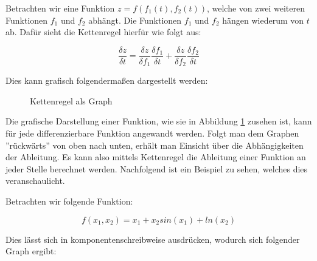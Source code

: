 Betrachten wir eine Funktion $z = f(f_1(t),f_2(t))$, welche von zwei weiteren Funktionen $f_1$ und $f_2$ abhängt. Die Funktionen $f_1$ und $f_2$ hängen wiederum von $t$ ab. Dafür sieht die Kettenregel hierfür wie folgt aus:

\begin{equation}\label{eq:Kettenregel}
\frac{\delta z}{\delta t} = \frac{\delta z}{\delta f_1}\frac{\delta f_1}{\delta t} + \frac{\delta z}{\delta f_2}\frac{\delta f_2}{\delta t} 
\end{equation}

Dies kann grafisch folgendermaßen dargestellt werden:

\begin{figure}[H]
 \centering
{}
\caption{Kettenregel als Graph \label{fig:KettenregelGraph}}
\end{figure}

Die grafische Darstellung einer Funktion, wie sie in Abbildung \ref{fig:KettenregelGraph} zusehen ist, kann für jede differenzierbare Funktion angewandt werden. Folgt man dem Graphen ''rückwärts'' von oben nach unten, erhält man Einsicht über die Abhängigkeiten der Ableitung. Es kann also mittels Kettenregel die Ableitung einer Funktion an jeder Stelle berechnet werden. Nachfolgend ist ein Beispiel zu sehen, welches dies veranschaulicht.

Betrachten wir folgende Funktion:

\begin{equation}\label{eq:funktion1}
f(x_1,x_2) = x_1 + x_2 sin(x_1)+ln(x_2)
\end{equation}

Dies lässt sich in komponentenschreibweise ausdrücken, wodurch sich folgender Graph ergibt:

